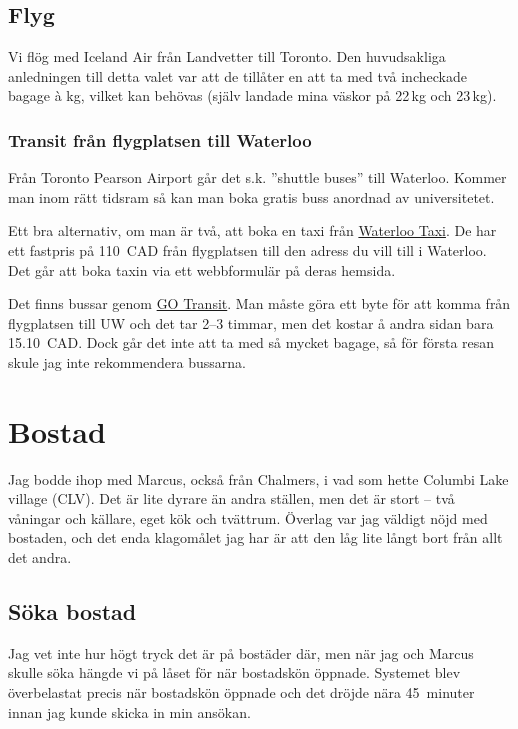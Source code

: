 \documentclass[11pt,a4paper, english, swedish]{article}
\begin{document}
\subsection{Flyg}
Vi flög med Iceland Air från Landvetter till Toronto. Den huvudsakliga
anledningen till detta valet var att de tillåter en att ta med två
incheckade bagage à \unit[23]{kg}, vilket kan behövas (själv landade
mina väskor på 22\,kg och 23\,kg).

\subsubsection{Transit från flygplatsen till Waterloo}
Från Toronto Pearson Airport går det s.k. ''shuttle buses'' till
Waterloo. Kommer man inom rätt tidsram så kan man boka gratis buss
anordnad av universitetet. 

Ett bra alternativ, om man är två, att boka en taxi från
\href{http://waterlootaxi.ca/}{Waterloo Taxi}. De har ett fastpris på
110~CAD från flygplatsen till den adress du vill till i Waterloo. Det
går att boka taxin via ett webbformulär på deras hemsida. 

Det finns bussar genom 
\href{http://www.gotransit.com/}{GO Transit}. Man måste göra ett byte
för att komma från flygplatsen till UW och det tar 2--3 timmar, men
det kostar å andra sidan bara 15.10~CAD. Dock går det inte att ta med
så mycket bagage, så för första resan skule jag inte rekommendera
bussarna. 





\section{Bostad}
Jag bodde ihop med Marcus, också från Chalmers, i vad som hette
Columbi Lake village (CLV). Det är lite dyrare än andra ställen, men
det är stort -- två våningar och källare, eget kök och tvättrum.
Överlag var jag väldigt nöjd med bostaden, och det enda klagomålet jag
har är att den låg lite långt bort från allt det andra.

\subsection{Söka bostad}
Jag vet inte hur högt tryck det är på bostäder där, men när jag och
Marcus skulle söka hängde vi på låset för när bostadskön
öppnade. Systemet blev överbelastat precis när bostadskön öppnade och
det dröjde nära 45~minuter innan jag kunde skicka in min ansökan.
\end{document}
